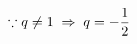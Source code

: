 \documentclass[preview]{standalone}
\begin{document}
\begin{align*}
\special{dvisvgm:raw <g id='unique000'>}\because q\neq1 \;\Rightarrow\; q=-\frac{1}{2}\special{dvisvgm:raw </g>}
\end{align*}
\end{document}
